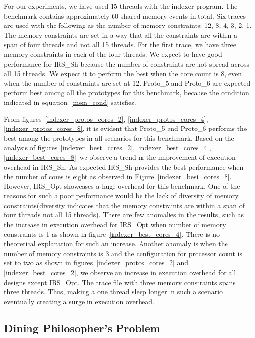 {For our experiments, we have used 15 threads with the indexer program. 
The benchmark contains approximately 60 shared-memory events in total. 
Six traces are used with the following as the number of memory constraints: 12, 8, 4, 3, 2, 1. 
The memory constraints are set in a way that all the constraints are within a span of four threads and not all 15 threads. 
For the first trace, we have three memory constraints in each of the four threads.
We expect to have good performance for IRS\_Sh because the number of constraints are not spread across all 15 threads. 
We expect it to perform the best when the core count is 8, even when the number of constraints are set at 12. 
Proto\_5 and Proto\_6 are expected perform best among all the prototypes for this benchmark, because the condition indicated in equation~\ref{mem_cond} satisfies. 

From figures~\ref{indexer_protos_cores_2}, \ref{indexer_protos_cores_4}, \ref{indexer_protos_cores_8}, it is evident that Proto\_5 and Proto\_6 performs the best among the prototypes in all scenarios for this benchmark. 
Based on the analysis of figures~\ref{indexer_best_cores_2}, \ref{indexer_best_cores_4}, \ref{indexer_best_cores_8}\, we observe a trend in the improvement of execution overhead in IRS\_Sh. 
As expected IRS\_Sh provides the best performance when the number of cores is eight as observed in Figure~\ref{indexer_best_cores_8}.
However, IRS\_Opt showcases a huge overhead for this benchmark. 
One of the reasons for such a poor performance would be the lack of diversity of memory constraints(diversity indicates that the memory constraints are within a span of four threads not all 15 threads). 
There are few anomalies in the results, such as the increase in execution overhead for IRS\_Opt when number of memory constraints is 1 as shown in figure~\ref{indexer_best_cores_4}. 
There is no theoretical explanation for such an increase. 
Another anomaly is when the number of memory constraints is 3 and the configuration for processor count is set to two as shown in figures~\ref{indexer_protos_cores_2} and \ref{indexer_best_cores_2}, we observe an increase in execution overhead for all designs except IRS\_Opt. 
The trace file with three memory constraints spans three threads. 
Thus, making a one thread sleep longer in such a scenario eventually creating a surge in execution overhead. 




\subsection{Dining Philosopher's Problem}

}
